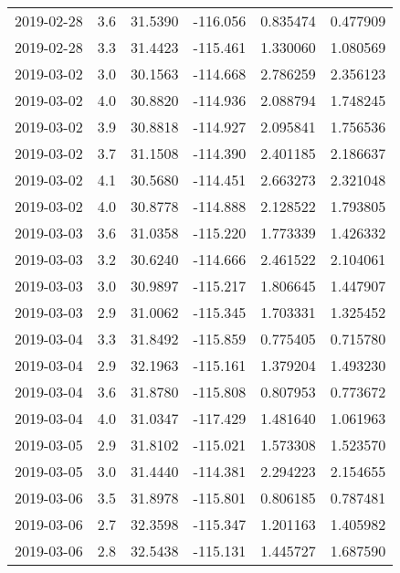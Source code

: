 \begin{tabular}{lrrrrr}
2019-02-28 &       3.6 &  31.5390 &  -116.056 &         0.835474 &         0.477909 \\
2019-02-28 &       3.3 &  31.4423 &  -115.461 &         1.330060 &         1.080569 \\
2019-03-02 &       3.0 &  30.1563 &  -114.668 &         2.786259 &         2.356123 \\
2019-03-02 &       4.0 &  30.8820 &  -114.936 &         2.088794 &         1.748245 \\
2019-03-02 &       3.9 &  30.8818 &  -114.927 &         2.095841 &         1.756536 \\
2019-03-02 &       3.7 &  31.1508 &  -114.390 &         2.401185 &         2.186637 \\
2019-03-02 &       4.1 &  30.5680 &  -114.451 &         2.663273 &         2.321048 \\
2019-03-02 &       4.0 &  30.8778 &  -114.888 &         2.128522 &         1.793805 \\
2019-03-03 &       3.6 &  31.0358 &  -115.220 &         1.773339 &         1.426332 \\
2019-03-03 &       3.2 &  30.6240 &  -114.666 &         2.461522 &         2.104061 \\
2019-03-03 &       3.0 &  30.9897 &  -115.217 &         1.806645 &         1.447907 \\
2019-03-03 &       2.9 &  31.0062 &  -115.345 &         1.703331 &         1.325452 \\
2019-03-04 &       3.3 &  31.8492 &  -115.859 &         0.775405 &         0.715780 \\
2019-03-04 &       2.9 &  32.1963 &  -115.161 &         1.379204 &         1.493230 \\
2019-03-04 &       3.6 &  31.8780 &  -115.808 &         0.807953 &         0.773672 \\
2019-03-04 &       4.0 &  31.0347 &  -117.429 &         1.481640 &         1.061963 \\
2019-03-05 &       2.9 &  31.8102 &  -115.021 &         1.573308 &         1.523570 \\
2019-03-05 &       3.0 &  31.4440 &  -114.381 &         2.294223 &         2.154655 \\
2019-03-06 &       3.5 &  31.8978 &  -115.801 &         0.806185 &         0.787481 \\
2019-03-06 &       2.7 &  32.3598 &  -115.347 &         1.201163 &         1.405982 \\
2019-03-06 &       2.8 &  32.5438 &  -115.131 &         1.445727 &         1.687590 \\

\end{tabular}
